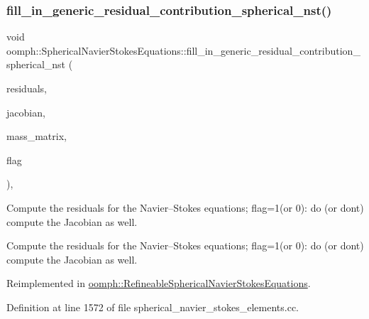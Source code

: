 \subsubsection{\texorpdfstring{fill\+\_\+in\+\_\+generic\+\_\+residual\+\_\+contribution\+\_\+spherical\+\_\+nst()}{fill\_in\_generic\_residual\_contribution\_spherical\_nst()}}
{\footnotesize\ttfamily void oomph\+::\+Spherical\+Navier\+Stokes\+Equations\+::fill\+\_\+in\+\_\+generic\+\_\+residual\+\_\+contribution\+\_\+spherical\+\_\+nst (\begin{DoxyParamCaption}\item[{\hyperlink{classoomph_1_1Vector}{Vector}$<$ double $>$ \&}]{residuals,  }\item[{\hyperlink{classoomph_1_1DenseMatrix}{Dense\+Matrix}$<$ double $>$ \&}]{jacobian,  }\item[{\hyperlink{classoomph_1_1DenseMatrix}{Dense\+Matrix}$<$ double $>$ \&}]{mass\+\_\+matrix,  }\item[{unsigned}]{flag }\end{DoxyParamCaption})\hspace{0.3cm}{\ttfamily [protected]}, {\ttfamily [virtual]}}



Compute the residuals for the Navier--Stokes equations; flag=1(or 0)\+: do (or don\textquotesingle{}t) compute the Jacobian as well. 

Compute the residuals for the Navier--Stokes equations; flag=1(or 0)\+: do (or don\textquotesingle{}t) compute the Jacobian as well. 

Reimplemented in \hyperlink{classoomph_1_1RefineableSphericalNavierStokesEquations_aaadda4a5dbffc1e23db2ac8b3dd86d4a}{oomph\+::\+Refineable\+Spherical\+Navier\+Stokes\+Equations}.



Definition at line 1572 of file spherical\+\_\+navier\+\_\+stokes\+\_\+elements.\+cc.



